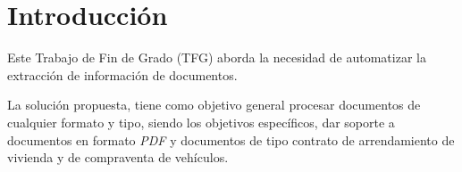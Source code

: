\chapter{Introducción}\label{ch:chapter_1}

Este Trabajo de Fin de Grado (TFG) aborda la necesidad de automatizar la extracción de información de documentos.

La solución propuesta, tiene como objetivo general procesar documentos de cualquier formato y tipo, siendo los objetivos
específicos, dar soporte a documentos en formato \textit{PDF} y documentos de tipo contrato de arrendamiento de
vivienda y de compraventa de vehículos.





